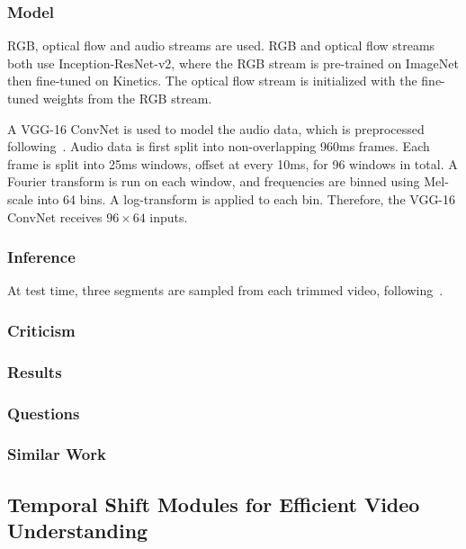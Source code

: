 \documentclass[a4paper, 12pt]{article}
\begin{document}
\subsubsection{Model}

RGB, optical flow and audio streams are used. RGB and optical flow streams both
use Inception-ResNet-v2, where the RGB stream is pre-trained on ImageNet then
fine-tuned on Kinetics. The optical flow stream is initialized with the
fine-tuned weights from the RGB stream.

A VGG-16 ConvNet is used to model the audio data, which is preprocessed
following~\citet{DBLP:journals/corr/HersheyCEGJMPPS16}. Audio data is first
split into non-overlapping 960ms frames. Each frame is split into 25ms windows,
offset at every 10ms, for 96 windows in total. A Fourier transform is run on
each window, and frequencies are binned using Mel-scale into 64 bins. A
log-transform is applied to each bin. Therefore, the VGG-16 ConvNet receives
$96 \times 64$ inputs.

\subsubsection{Inference}

At test time, three segments are sampled from each trimmed video,
following~\citet{DBLP:journals/corr/WangXW0LTG16}.

\subsubsection{Criticism}

\subsubsection{Results}

\subsubsection{Questions}

\subsubsection{Similar Work}


\subsection{Temporal Shift Modules for Efficient Video
            Understanding~\cite{lin2018temporal}}
\end{document}

